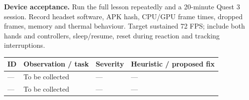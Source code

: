 \textbf{Device acceptance.} Run the full lesson repeatedly and a 20-minute Quest 3 session. Record headset software, APK hash, CPU/GPU frame times, dropped frames, memory and thermal behaviour. Target sustained 72 FPS; include both hands and controllers, sleep/resume, reset during reaction and tracking interruptions.

\begin{tabularx}{\linewidth}{@{}p{13mm}Yp{20mm}Y@{}}\toprule
ID & Observation / task & Severity & Heuristic / proposed fix\\\midrule
--- & To be collected & --- & ---\\[8mm]
--- & To be collected & --- & ---\\\bottomrule
\end{tabularx}
